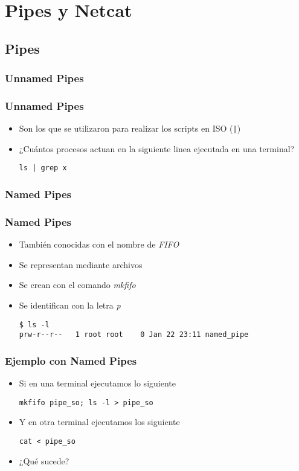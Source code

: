 \section{Pipes y Netcat}
\subsection{Pipes}

\subsubsection{Unnamed Pipes}
\begin{frame}[fragile]
  \frametitle{Unnamed Pipes}
  \begin{itemize}
    \item Son los que se utilizaron para realizar los scripts en ISO (\texttt{|})
    \item ¿Cuántos procesos actuan en la siguiente linea ejecutada en una terminal?
    \begin{lstlisting}
ls | grep x
    \end{lstlisting}
  \end{itemize}
\end{frame}

\subsubsection{Named Pipes}
\begin{frame}[fragile]
  \frametitle{Named Pipes}
  \begin{itemize}
    \item También conocidas con el nombre de \textit{FIFO}
    \item Se representan mediante archivos
    \item Se crean con el comando \textit{mkfifo}
    \item Se identifican con la letra \textit{p}
    \begin{lstlisting}
$ ls -l
prw-r--r--   1 root root    0 Jan 22 23:11 named_pipe
    \end{lstlisting}
  \end{itemize}
\end{frame}

\begin{frame}[fragile]
  \frametitle{Ejemplo con Named Pipes}
  \begin{itemize}
   \item Si en una terminal ejecutamos lo siguiente
   \begin{lstlisting}
mkfifo pipe_so; ls -l > pipe_so
   \end{lstlisting}
   \item Y en otra terminal ejecutamos los siguiente
   \begin{lstlisting}
cat < pipe_so
   \end{lstlisting}
   \item ¿Qué sucede?
  \end{itemize}
\end{frame}

